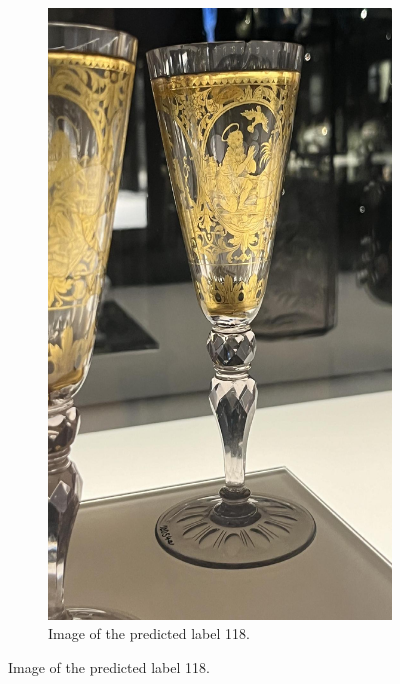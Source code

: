 \begin{figure}[h]
\begin{subfigure}[b]{0.4\textwidth}
        \includegraphics[width=\textwidth]{img/118.jpg}
        \caption{Image of the predicted label 118.}
    \end{subfigure}

    \vspace{1em}


\end{figure}
